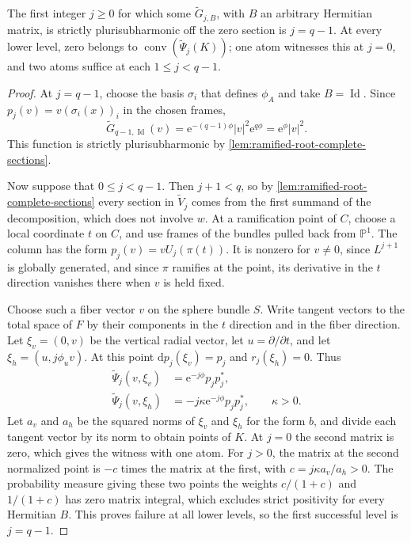 \begin{proposition}\label{prop:ramified-root-first-success}
The first integer $j\geq0$ for which some $\widetilde G_{j,B}$, with $B$ an arbitrary Hermitian matrix, is strictly plurisubharmonic off the zero section is $j=q-1$. At every lower level, zero belongs to $\operatorname{conv}(\widetilde\Psi_j(K))$; one atom witnesses this at $j=0$, and two atoms suffice at each $1\leq j<q-1$.
\end{proposition}
\begin{proof}
At $j=q-1$, choose the basis $\sigma_i$ that defines $\phi_A$ and take $B=\operatorname{Id}$. Since $p_j(v)=v(\sigma_i(x))_i$ in the chosen frames,
\[
 \widetilde G_{q-1,\operatorname{Id}}(v)
       =\mathrm e^{-(q-1)\phi}|v|^2\mathrm e^{q\phi}
       =\mathrm e^\phi|v|^2.
\]
This function is strictly plurisubharmonic by \cref{lem:ramified-root-complete-sections}.

Now suppose that $0\leq j<q-1$. Then $j+1<q$, so by \cref{lem:ramified-root-complete-sections} every section in $\widetilde V_j$ comes from the first summand of the decomposition, which does not involve $w$. At a ramification point of $C$, choose a local coordinate $t$ on $C$, and use frames of the bundles pulled back from $\mathbb P^1$. The column has the form $p_j(v)=vU_j(\pi(t))$. It is nonzero for $v\ne0$, since $L^{j+1}$ is globally generated, and since $\pi$ ramifies at the point, its derivative in the $t$ direction vanishes there when $v$ is held fixed.

Choose such a fiber vector $v$ on the sphere bundle $S$. Write tangent vectors to the total space of $F$ by their components in the $t$ direction and in the fiber direction. Let $\xi_v=(0,v)$ be the vertical radial vector, let $u=\partial/\partial t$, and let $\xi_h=(u,j\phi_u v)$. At this point $\mathrm dp_j(\xi_v)=p_j$ and $r_j(\xi_h)=0$. Thus
\[
 \begin{aligned}
 \widetilde\Psi_j(v,\xi_v)&=\mathrm e^{-j\phi}p_jp_j^*,\\
 \widetilde\Psi_j(v,\xi_h)&=-j\kappa\mathrm e^{-j\phi}p_jp_j^*,
 \qquad\kappa>0.
 \end{aligned}
\]
Let $a_v$ and $a_h$ be the squared norms of $\xi_v$ and $\xi_h$ for the form $b$, and divide each tangent vector by its norm to obtain points of $K$. At $j=0$ the second matrix is zero, which gives the witness with one atom. For $j>0$, the matrix at the second normalized point is $-c$ times the matrix at the first, with $c=j\kappa a_v/a_h>0$. The probability measure giving these two points the weights $c/(1+c)$ and $1/(1+c)$ has zero matrix integral, which excludes strict positivity for every Hermitian $B$. This proves failure at all lower levels, so the first successful level is $j=q-1$.
\end{proof}

